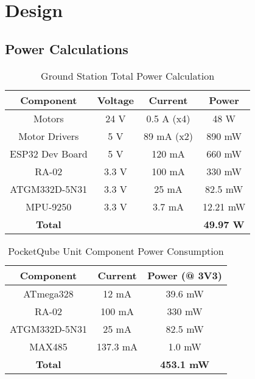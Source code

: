 \chapter{Design}
\section{Power Calculations}
\begin{table}[!htb]
  \centering
  \renewcommand{\arraystretch}{1.2}
  \begin{tabular}{ |c|c|c|c| }
  \hline
  \textbf{Component}        & \textbf{Voltage}    & \textbf{Current}     & \textbf{Power}   \\
  \hline
  Motors                    & 24 V                & 0.5 A (x4)           & 48 W             \\ \hline
  Motor Drivers             & 5 V                 & 89 mA (x2)           & 890 mW           \\ \hline
  ESP32 Dev Board           & 5 V                 & 120 mA               & 660 mW           \\ \hline
  RA-02                     & 3.3 V               & 100 mA               & 330 mW           \\ \hline
  ATGM332D-5N31             & 3.3 V               & 25 mA                & 82.5 mW          \\ \hline
  MPU-9250                  & 3.3 V               & 3.7 mA               & 12.21 mW         \\ \hline
  \textbf{Total}            &                     &                      & \textbf{49.97 W}         \\ \hline
  \end{tabular}
  \caption{Ground Station Total Power Calculation}
  \label{tab:gs_component_consumption}
\end{table}

\begin{table}[!htb]
  \centering
  \renewcommand{\arraystretch}{1.2}
  \begin{tabular}{ |c|c|c| }
  \hline
  \textbf{Component}        & \textbf{Current}        & \textbf{Power (@ 3V3)}      \\ \hline 
  ATmega328                 & 12 mA                   & 39.6 mW                     \\ \hline 
  RA-02                     & 100 mA                  & 330 mW                      \\ \hline 
  ATGM332D-5N31             & 25 mA                   & 82.5 mW                     \\ \hline
  MAX485                    & 137.3 mA                & 1.0 mW                        \\ \hline
  \textbf{Total}            &                         & \textbf{453.1 mW}         \\ \hline
  \end{tabular}
  \caption{PocketQube Unit Component Power Consumption}
  \label{tab:pqunit_component_consumption}
\end{table}


